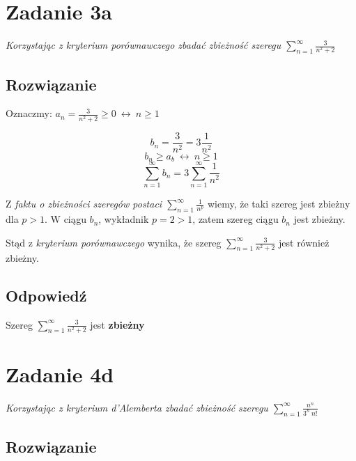 \documentclass{article}
\newcommand{\for}{\ \leftrightarrow\ }
\newcommand{\task}[1]{\textit{#1}}
\DeclareMathOperator{\?}{?}
\begin{document}
\section*{Zadanie 3a}
\task{Korzystając z kryterium porównawczego zbadać zbieżność szeregu
$\displaystyle \sum_{n=1}^{\infty}{\frac{3}{n^2 + 2}}$}

\subsection*{Rozwiązanie}

Oznaczmy: $ \displaystyle a_n = \frac{3}{n^2 + 2} \ge 0 \for n \ge 1 $

\[ b_n = \frac{3}{n^2} = 3\frac{1}{n^2} \]
\[ b_n \ge a_b \for n \ge 1 \]
\[ \sum_{n=1}^{\infty}{b_n} = 3\sum_{n=1}^{\infty}{\frac{1}{n^2}} \]

Z \textit{faktu o zbieżności szeregów postaci $\sum_{n=1}^{\infty}{\frac{1}{n^p}}$}
wiemy, że taki szereg jest zbieżny dla $p > 1$. W ciągu $b_n$, wykładnik $p=2>1$, zatem
szereg ciągu $b_n$ jest zbieżny.

Stąd z \textit{kryterium porównawczego} wynika, że szereg
$\displaystyle \sum_{n=1}^{\infty}{\frac{3}{n^2 + 2}}$ jest również zbieżny.

\subsection*{Odpowiedź}
\centerline{Szereg $\displaystyle \sum_{n=1}^{\infty}{\frac{3}{n^2 + 2}}$ jest \textbf{zbieżny}}

\vspace{5em}

\section*{Zadanie 4d}
\task{Korzystając z kryterium d’Alemberta zbadać zbieżność szeregu
$\displaystyle \sum_{n=1}^{\infty}{\frac{n^n}{3^n\ n!}}$}

\subsection*{Rozwiązanie}
\end{document}
